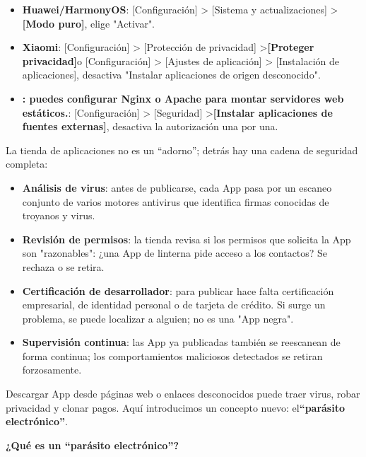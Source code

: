 
\begin{itemize}
  \item \textbf{Huawei/HarmonyOS}: [Configuración] > [Sistema y actualizaciones] >\textbf{[Modo puro]}, elige "Activar".
  \item \textbf{Xiaomi}: [Configuración] > [Protección de privacidad] >\textbf{[Proteger privacidad]}o [Configuración] > [Ajustes de aplicación] > [Instalación de aplicaciones], desactiva "Instalar aplicaciones de origen desconocido".
  \item \textbf{: puedes configurar Nginx o Apache para montar servidores web estáticos.}: [Configuración] > [Seguridad] >\textbf{[Instalar aplicaciones de fuentes externas]}, desactiva la autorización una por una.
\end{itemize}


La tienda de aplicaciones no es un “adorno”; detrás hay una cadena de seguridad completa:

\begin{itemize}
  \item \textbf{Análisis de virus}: antes de publicarse, cada App pasa por un escaneo conjunto de varios motores antivirus que identifica firmas conocidas de troyanos y virus.
  \item \textbf{Revisión de permisos}: la tienda revisa si los permisos que solicita la App son "razonables": ¿una App de linterna pide acceso a los contactos? Se rechaza o se retira.
  \item \textbf{Certificación de desarrollador}: para publicar hace falta certificación empresarial, de identidad personal o de tarjeta de crédito. Si surge un problema, se puede localizar a alguien; no es una "App negra".
  \item \textbf{Supervisión continua}: las App ya publicadas también se reescanean de forma continua; los comportamientos maliciosos detectados se retiran forzosamente.
\end{itemize}


Descargar App desde páginas web o enlaces desconocidos puede traer virus, robar privacidad y clonar pagos. Aquí introducimos un concepto nuevo: el\textbf{“parásito electrónico”}.

\textbf{¿Qué es un “parásito electrónico”?}\par

